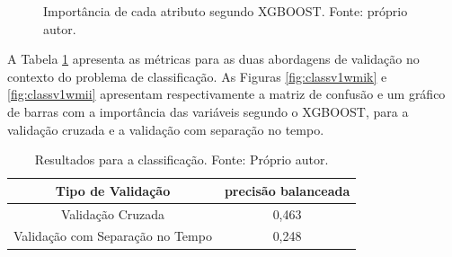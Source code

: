 \begin{figure}[h]
\center
{}
\caption{Importância de cada atributo segundo XGBOOST. Fonte: próprio autor.}\label{fig:regv1w}
\end{figure}

A Tabela \ref{tab:results_v1_w_class} apresenta as métricas para as duas abordagens de validação no contexto do problema de classificação. As Figuras \ref{fig:classv1wmik} e \ref{fig:classv1wmii} apresentam respectivamente a matriz de confusão e um gráfico de barras com a importância das variáveis segundo o XGBOOST, para a validação cruzada e a validação com separação no tempo.

\begin{table}[h]
\begin{center}
\begin{tabular}{|c|c|}
\hline
Tipo de Validação & precisão balanceada   \\ \hline
Validação Cruzada                   & 0,463    \\ \hline
Validação com Separação no Tempo    & 0,248     \\ \hline
\end{tabular}
\end{center}
\vspace{12pt}
\caption{Resultados para a classificação. Fonte: Próprio autor.}
\label{tab:results_v1_w_class}
\end{table}

